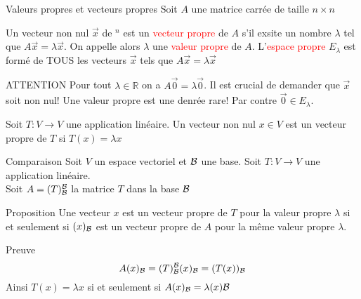\begin{parag}{Valeurs propres et vecteurs propres}
Soit $A$ une matrice carrée de taille $n \times n$
    \begin{definition}
        Un vecteur non nul $\vec{x}$ de \R$^n$ est un \textcolor{red}{vecteur propre} de $A$ s'il exsite un nombre $\lambda$ tel que $A\vec{x} = \lambda \vec{x}$. On appelle alors $\lambda$ une \textcolor{red}{valeur propre} de $A$. L'\textcolor{red}{espace propre} $E_\lambda$ est formé de TOUS les vecteurs $\vec{x}$ tels que $A\vec{x} = \lambda\vec{x}$
    \end{definition}
    \begin{subparag}{ATTENTION}
        Pour tout $\lambda \in \mathbb{R}$ on a $A\vec{0} = \lambda \vec{0}$. Il est crucial de demander que $\vec{x}$ soit non nul! Une valeur propre est une denrée rare! Par contre $\vec{0} \in E_\lambda$.
    \end{subparag}

    \begin{definition}
        Soit $T : V \to V$ une application linéaire. Un vecteur non nul $x \in V$ est un vecteur propre de $T$ si $T(x) = \lambda x$
    \end{definition}

    \begin{subparag}{Comparaison}
        Soit $V$ un espace vectoriel et $\mathcal{B}$ une base. Soit $T: V \to V$ une application linéaire.
        \\
        Soit $A = (T)_{\mathcal{B}}^{\mathcal{B}}$ la matrice $T$ dans la base $\mathcal{B}$

    \end{subparag}


    \begin{subparag}{Proposition}
        Une vecteur $x$ est un vecteur propre de $T$ pour la valeur propre $\lambda$ si et seulement si $(x)_{\mathcal{B}}$ est un vecteur propre de $A$ pour la même valeur propre $\lambda$.
        \end{subparag}
    \begin{subparag}{Preuve}
        \[A(x)_{\mathcal{B}} = (T)_{\mathcal{B}}^{\mathcal{B}}(x)_{\mathcal{B}} = (T(x))_{\mathcal{B}}\]
        Ainsi $T(x) = \lambda x$ si et seulement si $A(x)_{\mathcal{B}} = \lambda(x)\mathcal{B}$
    \end{subparag}


\end{parag}
